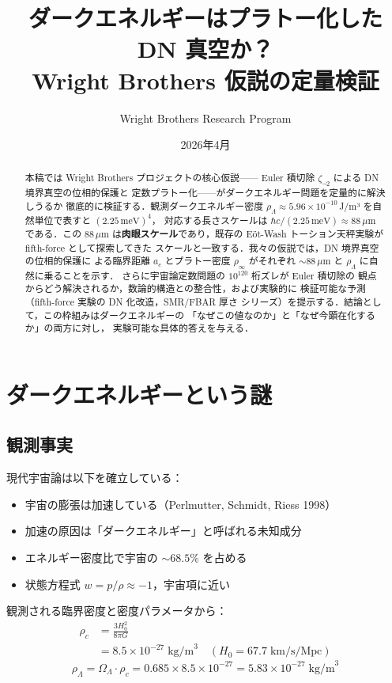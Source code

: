 \documentclass[11pt,a4paper]{article}
\title{ダークエネルギーはプラトー化した DN 真空か？\\
\large Wright Brothers 仮説の定量検証}
\author{Wright Brothers Research Program}
\date{2026年4月}
\begin{document}
\maketitle

\begin{abstract}
本稿では Wright Brothers プロジェクトの核心仮説——
Euler 積切除 $\zeta_{\neg 2}$ による DN 境界真空の位相的保護と
定数プラトー化——がダークエネルギー問題を定量的に解決しうるか
徹底的に検証する．観測ダークエネルギー密度 $\rho_\Lambda \approx
5.96 \times 10^{-10}$\,J/m³ を自然単位で表すと $(2.25\,\text{meV})^4$，
対応する長さスケールは $\hbar c/(2.25\,\text{meV}) \approx 88\,\mu$m
である．この 88\,$\mu$m は\textbf{肉眼スケール}であり，既存の
Eöt-Wash トーション天秤実験が fifth-force として探索してきた
スケールと一致する．我々の仮説では，DN 境界真空の位相的保護に
よる臨界距離 $a_c$ とプラトー密度 $\rho_\infty$ がそれぞれ
$\sim 88\,\mu$m と $\rho_\Lambda$ に自然に乗ることを示す．
さらに宇宙論定数問題の $10^{120}$ 桁ズレが Euler 積切除の
観点からどう解決されるか，数論的構造との整合性，および実験的に
検証可能な予測（fifth-force 実験の DN 化改造，SMR/FBAR 厚さ
シリーズ）を提示する．結論として，この枠組みはダークエネルギーの
「なぜこの値なのか」と「なぜ今顕在化するか」の両方に対し，
実験可能な具体的答えを与える．
\end{abstract}

\tableofcontents

\newpage
\section{ダークエネルギーという謎}

\subsection{観測事実}

現代宇宙論は以下を確立している：

\begin{itemize}
\item 宇宙の膨張は加速している（Perlmutter, Schmidt, Riess 1998）
\item 加速の原因は「ダークエネルギー」と呼ばれる未知成分
\item エネルギー密度比で宇宙の $\sim 68.5\%$ を占める
\item 状態方程式 $w = p/\rho \approx -1$，宇宙項に近い
\end{itemize}

観測される臨界密度と密度パラメータから：
\begin{align}
\rho_c &= \frac{3 H_0^2}{8\pi G} \\
       &= 8.5 \times 10^{-27}\;\text{kg/m}^3 \quad (H_0 = 67.7\;\text{km/s/Mpc})
\end{align}
\begin{equation}
\rho_\Lambda = \Omega_\Lambda \cdot \rho_c = 0.685 \times 8.5\times 10^{-27}
= 5.83 \times 10^{-27}\;\text{kg/m}^3
\end{equation}
\end{document}
